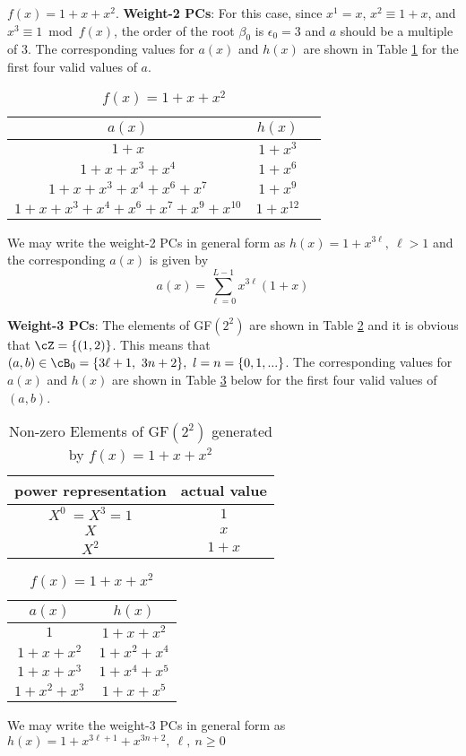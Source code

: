 \begin{example}$f(x)=1+x+x^2$.\newline 
\textbf{Weight-2 PCs}: 
For this case, since $x^1=x$, $x^2 \equiv 1+x$, and $x^3 \equiv 1 \bmod f(x)$, the order of the root $\beta_0$ is $\epsilon_0=3$ and $a$ should be a multiple of $3$. The corresponding values for $a(x)$ and $h(x)$ are shown in Table \ref{novelTab2} for the first four valid values of $a$.
\begin{table}[htbp]
 \caption{$f(x)=1+x+x^2$}
\centering
 \begin{tabular}{c c c} 
 $a(x)$ & $h(x)$ \\ [0.5ex] 
 \hline\hline
$1+x$
 & $1+x^{3}$ \\
\hline
$1+x+x^3+x^4$
 & $1+x^{6}$ 
 \\
\hline
$1+x+x^3+x^4+x^6+x^{7}$ 
&  $1+x^{9}$ 
\\
\hline
$1+x+x^3+x^4+x^6+x^{7}+x^9+x^{10}$
 &  $1+x^{12}$ \\
 \end{tabular}
 \label{novelTab2}
\end{table}
We may write the weight-2 PCs in general form as $h(x)=1+x^{3\ell},~\ell>1$ and the corresponding $a(x)$ is given by 
\begin{equation*}
a(x)=\sum_{\ell=0}^{L-1} x^{3\ell}(1+x)
\end{equation*}

\textbf{Weight-3 PCs}: The elements of GF$(2^2)$ are shown in Table \ref{novelTab7} and it is obvious that $\cZ=\{(1,2)\}$.
This means that $(a,b) \in \cB_0=\{3\ell+1,~3n+2\},~l=n=\left\{0,1,...\right\}$.  The corresponding values for $a(x)$ and $h(x)$ are shown in Table \ref{novelTab8} below for the first four valid values of $(a,b)$.
 \begin{table}[htbp]
 \caption{Non-zero Elements of GF$(2^2)$ generated by $f(x)=1+x+x^2$}
\centering
 \begin{tabular}{c c} 
 \hline
 power representation & actual value \\ [0.5ex] 
 \hline\hline
$X^0~=X^3=1$ & $1$\\
\hline
$X$ & $x$\\
\hline
$X^2$ &  $1+x$\\
\hline
 \end{tabular}
 \label{novelTab7}
\end{table}

\begin{table}[htbp]
 \caption{$f(x)=1+x+x^2$}
\centering
 \begin{tabular}{c c} 
 \hline
 $a(x)$ & $h(x)$\\ [0.5ex] 
 \hline\hline
$1$ & $1+x+x^2$\\ 
\hline
$1+x+x^2$ &  $1+x^2+x^4$\\
\hline
$1+x+x^3$ & $1+x^4+x^5$\\
\hline
$1+x^2+x^3$ & $1+x+x^5$ 
 \end{tabular}
 \label{novelTab8}
\end{table}

We may write the weight-3 PCs in general form as $h(x)=1+x^{3\ell+1}+x^{3n+2},~\ell,~n \geq 0$ 

\label{ex-1}
\end{example}
